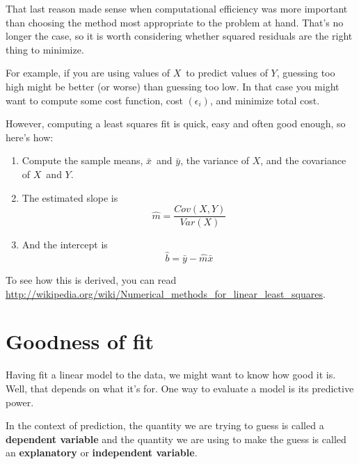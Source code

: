 That last reason made sense when computational efficiency was more
important than choosing the method most appropriate to the problem
at hand.  That's no longer the case, so it is worth considering
whether squared residuals are the right thing to minimize.

For example, if you are using values of $X$~to predict values of $Y$,
guessing too high might be better (or worse) than guessing too low.
In that case you might want to compute some cost function,
cost $(\epsilon_{i})$, and minimize total cost.

However, computing a least squares fit is quick, easy and often good
enough, so here's how:

\begin{enumerate}

\item Compute the sample means, $\bar{x}$~and $\bar{y}$, the variance
of $X$, and the covariance of $X$~and $Y$.

\item The estimated slope is
%
\[ \hat{m} = \frac{Cov(X,Y)}{Var(X)} \]
%
\item And the intercept is
%
\[ \hat{b} = \bar{y} - \hat{m} \bar{x} \]
%
\end{enumerate}

To see how this is derived, you can read
\url{http://wikipedia.org/wiki/Numerical_methods_for_linear_least_squares}.




\section{Goodness of fit}

Having fit a linear model to the data, we might want to know how good
it is.  Well, that depends on what it's for.  One way to evaluate a
model is its predictive power.

In the context of prediction, the quantity we are trying to guess is
called a \textbf{dependent variable} and the quantity we are using to
make the guess is called an \textbf{explanatory} or \textbf{independent
  variable}.


